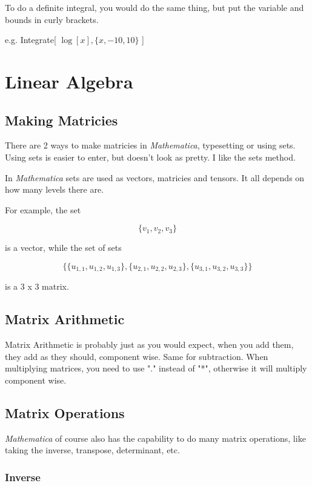 \documentclass[11pt,a4paper,twoside]{article}
\begin{document}
				To do a definite integral, you would do the same thing, but put the variable and bounds in curly brackets. 
						
				e.g. Integrate[ $ \log[x], \{ x,-10,10 \} $ ]
						
		\section{Linear Algebra}
				
			\subsection{Making Matricies}
					
				There are 2 ways to make matricies in \textit{Mathematica}, typesetting or using sets.  Using sets is easier to enter, but doesn't look as pretty.  I like the sets method.
				
				In \textit{Mathematica} sets are used as vectors, matricies and tensors.  It all depends on how many levels there are.
				
				For example, the set 
				
				\[ \{ v_1 , v_2 , v_3 \} \]
				
				is a vector, while the set of sets
				
				\[ \{ \{ u_{1,1} , u_{1,2} , u_{1,3} \} , \{ u_{2,1} , u_{2,2} , u_{2,3} \} , \{ u_{3,1} , u_{3,2} , u_{3,3} \} \} \]
				
				is a 3 x 3 matrix.
						
			\subsection{Matrix Arithmetic}
					
				Matrix Arithmetic is probably just as you would expect, when you add them, they add as they should, component wise.  Same for subtraction.  When multiplying matrices, you need to use "." instead of "*", otherwise it will multiply component wise.
						
			\subsection{Matrix Operations}
						
				\textit{Mathematica} of course also has the capability to do many matrix operations, like taking the inverse, transpose, determinant, etc.
						
				\subsubsection{Inverse}
								
\end{document}
